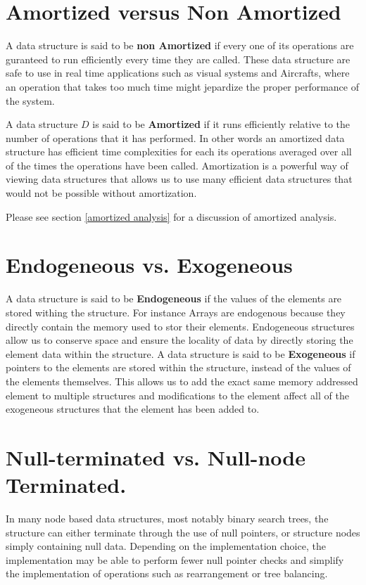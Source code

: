 \documentclass[12pt, letterpaper]{book}
\begin{document}
\section{Amortized versus Non Amortized}

A data structure is said to be \textbf{non Amortized} if every one of its operations are guranteed to run efficiently every time they are called. These data structure are safe to use in real time applications such as visual systems and Aircrafts, where an operation that takes too much time might jepardize the proper performance of the system.

A data structure $D$ is said to be \textbf{Amortized} if it runs efficiently relative to the number of operations that it has performed. In other words an amortized data structure has efficient time complexities for each its operations averaged over all of the times the operations have been called. Amortization is a powerful way of viewing data structures that allows us to use many efficient data structures that would not be possible without amortization.

Please see section \ref{amortized analysis} for a discussion of amortized analysis.

\section{Endogeneous vs. Exogeneous}

A data structure is said to be \textbf{Endogeneous} if the values of the elements are stored withing the structure. For instance Arrays are endogenous because they directly contain the memory used to stor their elements. Endogeneous structures allow us to conserve space and ensure the locality of data by directly storing the element data within the structure.
A data structure is said to be \textbf{Exogeneous} if pointers to the elements are stored within the structure, instead of the values of the elements themselves. This allows us to add the exact same memory addressed element to multiple structures and modifications to the element affect all of the exogeneous structures that the element has been added to.

\section[Null vs. Node terminals]{Null-terminated vs. Null-node Terminated.}

In many node based data structures, most notably binary search trees, the structure can either terminate through the use of null pointers, or structure nodes simply containing null data. Depending on the implementation choice, the implementation may be able to perform fewer null pointer checks and simplify the implementation of operations such as rearrangement or tree balancing.
\end{document}
